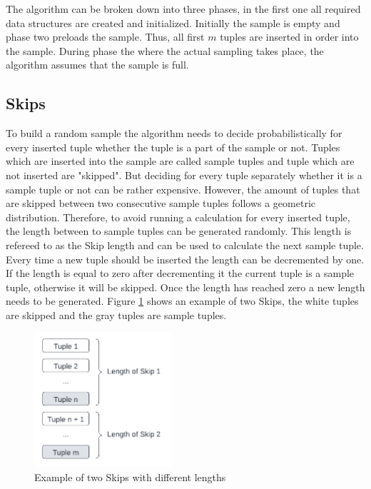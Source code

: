 \documentclass[sigconf,nonacm]{acmart}
\begin{document}
        The algorithm can be broken down into three phases, in the first one all required data structures are created and initialized. Initially the sample is empty and phase two preloads the sample. Thus, all first $m$ tuples are inserted in order into the sample. During phase the where the actual sampling takes place, the algorithm assumes that the sample is full.
        
    \subsection{Skips}
        To build a random sample the algorithm needs to decide probabilistically for every inserted tuple whether the tuple is a part of the sample or not. Tuples which are inserted into the sample are called sample tuples and tuple which are not inserted are "skipped". But deciding for every tuple separately whether it is a sample tuple or not can be rather expensive. However, the amount of tuples that are skipped between two consecutive sample tuples follows a geometric distribution. Therefore, to avoid running a calculation for every inserted tuple, the length between to sample tuples can be generated randomly. This length is refereed to as the Skip length and can be used to calculate the next sample tuple. Every time a new tuple should be inserted the length can be decremented by one. If the length is equal to zero after decrementing it the current tuple is a sample tuple, otherwise it will be skipped. Once the length has reached zero a new length needs to be generated. Figure \ref{fig:skips} shows an example of two Skips, 
        the white tuples are skipped and the gray tuples are sample tuples.
        \begin{figure}[H]
            \centering
            \includegraphics[height=5cm]{figure1.pdf}
            \caption{Example of two Skips with different lengths}
            \label{fig:skips}
        \end{figure}
\end{document}
